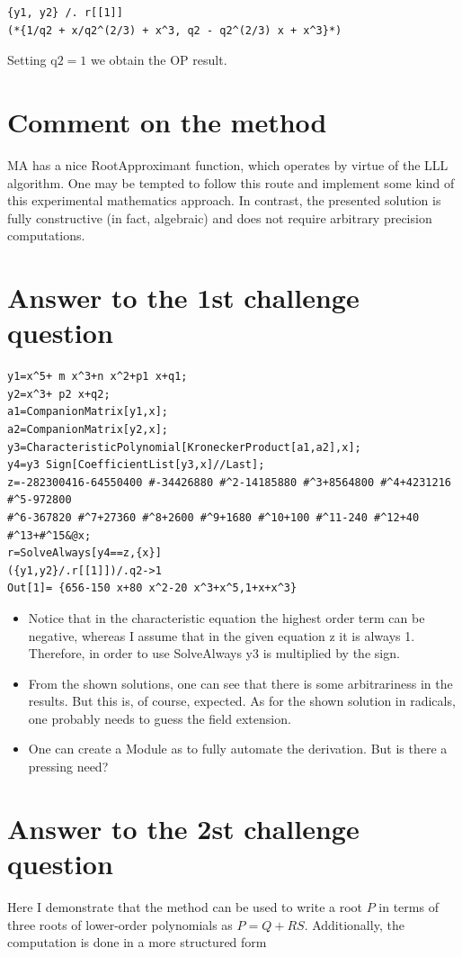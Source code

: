\documentclass[10pt]{article}
\begin{document}
\begin{verbatim}
{y1, y2} /. r[[1]]
(*{1/q2 + x/q2^(2/3) + x^3, q2 - q2^(2/3) x + x^3}*)
\end{verbatim}

Setting $\mathrm{q} 2=1$ we obtain the OP result.

\section*{Comment on the method}
MA has a nice RootApproximant function, which operates by virtue of the LLL algorithm. One may be tempted to follow this route and implement some kind of this experimental mathematics approach. In contrast, the presented solution is fully constructive (in fact, algebraic) and does not require arbitrary precision computations.

\section*{Answer to the 1st challenge question}
\begin{verbatim}
y1=x^5+ m x^3+n x^2+p1 x+q1;
y2=x^3+ p2 x+q2;
a1=CompanionMatrix[y1,x];
a2=CompanionMatrix[y2,x];
y3=CharacteristicPolynomial[KroneckerProduct[a1,a2],x];
y4=y3 Sign[CoefficientList[y3,x]//Last];
z=-282300416-64550400 #-34426880 #^2-14185880 #^3+8564800 #^4+4231216 #^5-972800
#^6-367820 #^7+27360 #^8+2600 #^9+1680 #^10+100 #^11-240 #^12+40 #^13+#^15&@x;
r=SolveAlways[y4==z,{x}]
({y1,y2}/.r[[1]])/.q2->1
Out[1]= {656-150 x+80 x^2-20 x^3+x^5,1+x+x^3}
\end{verbatim}

\begin{itemize}
  \item[-] Notice that in the characteristic equation the highest order term can be negative, whereas I assume that in the given equation z it is always 1. Therefore, in order to use SolveAlways y3 is multiplied by the sign.
  \item[-] From the shown solutions, one can see that there is some arbitrariness in the results. But this is, of course, expected. As for the shown solution in radicals, one probably needs to guess the field extension.
  \item[-] One can create a Module as to fully automate the derivation. But is there a pressing need?
\end{itemize}

\section*{Answer to the 2st challenge question}
Here I demonstrate that the method can be used to write a root $P$ in terms of three roots of lower-order polynomials as $P=Q+R S$. Additionally, the computation is done in a more structured form
\end{document}
